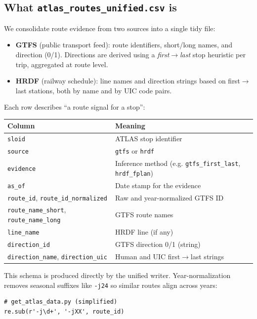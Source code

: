 \subsection{What \texttt{atlas\_routes\_unified.csv} is}
We consolidate route evidence from two sources into a single tidy file:
\begin{itemize}
  \item \textbf{GTFS} (public transport feed): route identifiers, short/long names, and direction (0/1). Directions are derived using a \emph{first$\rightarrow$last} stop heuristic per trip, aggregated at route level.
  \item \textbf{HRDF} (railway schedule): line names and direction strings based on first$\rightarrow$last stations, both by name and by UIC code pairs.
\end{itemize}
Each row describes ``a route signal for a stop'':
\begin{center}
\small
\begin{tabular}{l l}
\toprule
Column & Meaning \\
\midrule
\texttt{sloid} & ATLAS stop identifier\\
\texttt{source} & \texttt{gtfs} or \texttt{hrdf}\\
\texttt{evidence} & Inference method (e.g. \texttt{gtfs\_first\_last}, \texttt{hrdf\_fplan})\\
\texttt{as\_of} & Date stamp for the evidence\\
\texttt{route\_id}, \texttt{route\_id\_normalized} & Raw and year-normalized GTFS ID\\
\texttt{route\_name\_short}, \texttt{route\_name\_long} & GTFS route names\\
\texttt{line\_name} & HRDF line (if any)\\
\texttt{direction\_id} & GTFS direction 0/1 (string)\\
\texttt{direction\_name}, \texttt{direction\_uic} & Human and UIC first$\rightarrow$last strings\\
\bottomrule
\end{tabular}
\end{center}
This schema is produced directly by the unified writer. Year-normalization removes seasonal suffixes like \texttt{-j24} so similar routes align across years:
\begin{verbatim}
# get_atlas_data.py (simplified)
re.sub(r'-j\d+', '-jXX', route_id)
\end{verbatim}

